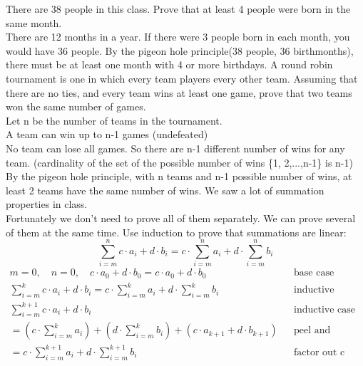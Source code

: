 \documentclass{exam}
\begin{document}
\begin{questions}
    \pagebreak
\question
There are 38 people in this class. Prove that at least 4 people were born in the same month.\\
   There are 12 months in a year. If there were 3 people born in each month, you would have 36 people. By the pigeon hole principle(38 people, 36 birthmonths), there must be at least one month with 4 or more birthdays.
\question
A round robin tournament is one in which every team players every other team.
Assuming that there are no ties, and every team wins at least one game, prove that two teams won the same number of games. \\
Let n be the number of teams in the tournament. \\
A team can win up to n-1 games (undefeated) \\
   No team can lose all games. So there are n-1 different number of wins for any team. (cardinality of the set of the possible number of wins \{1, 2,...,n-1\} is n-1) \\
By the pigeon hole principle, with n teams and n-1 possible number of wins, at least 2 teams have the same number of wins.
\question
We saw a lot of summation properties in class.\\
Fortunately we don't need to prove all of them separately.
We can prove several of them at the same time.
Use induction to prove that summations are linear:
    $$\sum_{i=m}^n c\cdot a_i + d\cdot b_i = c\cdot \sum_{i=m}^n a_i + d \cdot \sum_{i=m}^n b_i$$
    \begin{align*}
       m = 0, \quad n = 0, \quad c\cdot a_0+d\cdot b_0 = c\cdot a_0+d\cdot b_0 && \text{base case} \\
       \sum_{i=m}^k c\cdot a_i + d\cdot b_i = c\cdot \sum_{i=m}^k a_i + d \cdot \sum_{i=m}^k b_i && \text{inductive hypothesis} \\
       \sum_{i=m}^{k+1} c\cdot a_i + d\cdot b_i  && \text{inductive case} \\
       = \left(c\cdot \sum_{i=m}^k a_i\right) + \left(d \cdot \sum_{i=m}^k b_i\right) + (c \cdot a_{k+1} + d \cdot b_{k+1}) && \text{peel and substitute}\\
       = c\cdot \sum_{i=m}^{k+1} a_i + d \cdot \sum_{i=m}^{k+1} b_i && \text{factor out c and d and combine into sum}
    \end{align*}

\question

\end{questions}
\end{document}

